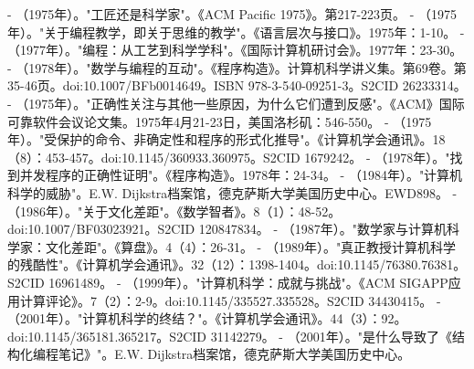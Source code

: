 \begin{itemize}
- （1975年）。"工匠还是科学家"。《ACM Pacific 1975》。第217-223页。
- （1975年）。"关于编程教学，即关于思维的教学"。《语言层次与接口》。1975年：1-10。
- （1977年）。"编程：从工艺到科学学科"。《国际计算机研讨会》。1977年：23-30。
- （1978年）。"数学与编程的互动"。《程序构造》。计算机科学讲义集。第69卷。第35-46页。doi:10.1007/BFb0014649。ISBN 978-3-540-09251-3。S2CID 26233314。
- （1975年）。"正确性关注与其他一些原因，为什么它们遭到反感"。《ACM》国际可靠软件会议论文集。1975年4月21-23日，美国洛杉矶：546-550。
- （1975年）。"受保护的命令、非确定性和程序的形式化推导"。《计算机学会通讯》。18（8）：453-457。doi:10.1145/360933.360975。S2CID 1679242。
- （1978年）。"找到并发程序的正确性证明"。《程序构造》。1978年：24-34。
- （1984年）。"计算机科学的威胁"。E.W. Dijkstra档案馆，德克萨斯大学美国历史中心。EWD898。
- （1986年）。"关于文化差距"。《数学智者》。8（1）：48-52。doi:10.1007/BF03023921。S2CID 120847834。
- （1987年）。"数学家与计算机科学家：文化差距"。《算盘》。4（4）：26-31。
- （1989年）。"真正教授计算机科学的残酷性"。《计算机学会通讯》。32（12）：1398-1404。doi:10.1145/76380.76381。S2CID 16961489。
- （1999年）。"计算机科学：成就与挑战"。《ACM SIGAPP应用计算评论》。7（2）：2-9。doi:10.1145/335527.335528。S2CID 34430415。
- （2001年）。"计算机科学的终结？"。《计算机学会通讯》。44（3）：92。doi:10.1145/365181.365217。S2CID 31142279。
- （2001年）。"是什么导致了《结构化编程笔记》"。E.W. Dijkstra档案馆，德克萨斯大学美国历史中心。
\end{itemize}